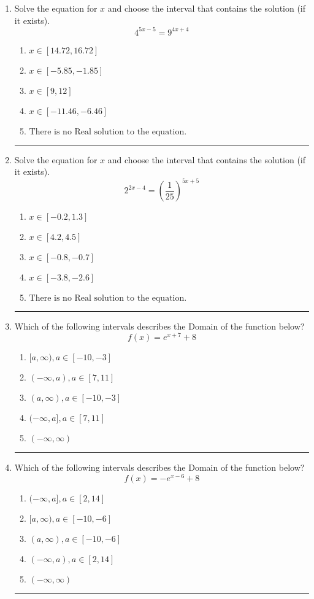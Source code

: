 \documentclass[14pt]{extbook}
\newcommand{\litem}[1]{\item#1\hspace*{-1cm}\rule{\textwidth}{0.4pt}}
\begin{document}
\begin{enumerate}
\litem{
Solve the equation for $x$ and choose the interval that contains the solution (if it exists).\[ 4^{5x-5} = 9^{4x+4} \]\begin{enumerate}[label=\Alph*.]
\item \( x \in [14.72, 16.72] \)
\item \( x \in [-5.85, -1.85] \)
\item \( x \in [9, 12] \)
\item \( x \in [-11.46, -6.46] \)
\item \( \text{There is no Real solution to the equation.} \)

\end{enumerate} }
\litem{
Solve the equation for $x$ and choose the interval that contains the solution (if it exists).\[ 2^{2x-4} = \left(\frac{1}{25}\right)^{5x+5} \]\begin{enumerate}[label=\Alph*.]
\item \( x \in [-0.2, 1.3] \)
\item \( x \in [4.2, 4.5] \)
\item \( x \in [-0.8, -0.7] \)
\item \( x \in [-3.8, -2.6] \)
\item \( \text{There is no Real solution to the equation.} \)

\end{enumerate} }
\litem{
Which of the following intervals describes the Domain of the function below?\[ f(x) = e^{x+7}+8 \]\begin{enumerate}[label=\Alph*.]
\item \( [a, \infty), a \in [-10, -3] \)
\item \( (-\infty, a), a \in [7, 11] \)
\item \( (a, \infty), a \in [-10, -3] \)
\item \( (-\infty, a], a \in [7, 11] \)
\item \( (-\infty, \infty) \)

\end{enumerate} }
\litem{
Which of the following intervals describes the Domain of the function below?\[ f(x) = -e^{x-6}+8 \]\begin{enumerate}[label=\Alph*.]
\item \( (-\infty, a], a \in [2, 14] \)
\item \( [a, \infty), a \in [-10, -6] \)
\item \( (a, \infty), a \in [-10, -6] \)
\item \( (-\infty, a), a \in [2, 14] \)
\item \( (-\infty, \infty) \)


\end{enumerate}}
\end{enumerate}
\end{document}
